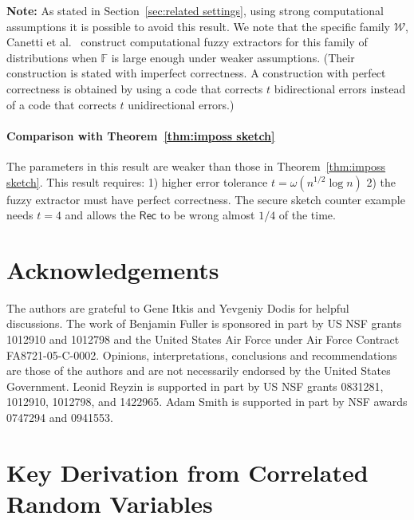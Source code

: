 \documentclass[11pt]{article}
\newcommand{\secref}[1]{\mbox{Section~\ref{#1}}}
\newcommand{\thref}[1]{\mbox{Theorem~\ref{#1}}}
\newcommand{\class}[1]{{\ensuremath{\mathsf{#1}}}}
\newcommand{\rec}{\ensuremath{\class{Rec}}\xspace}
\begin{document}
\noindent
\textbf{Note:} As stated in \secref{sec:related settings}, using strong computational assumptions it is possible to avoid this result.  We note that the specific family $\mathcal{W}$, Canetti et al.~\cite[Construction 5.3]{canetti2014key} construct computational fuzzy extractors  for this family of distributions when $\mathbb{F}$ is large enough under weaker assumptions.  (Their construction is stated with imperfect correctness.  A construction with perfect correctness is obtained by using a code that corrects $t$ bidirectional errors instead of a code that corrects $t$ unidirectional errors.)

\paragraph{Comparison with \thref{thm:imposs sketch}} The parameters in this result are weaker than those in \thref{thm:imposs sketch}.  This result requires: 1) higher error tolerance $t= \omega(n^{1/2}\log n)$ 2) the fuzzy extractor must have perfect correctness.  The secure sketch counter example needs $t=4$ and allows the $\rec$ to be wrong almost $1/4$ of the time.

\section*{Acknowledgements}
The authors are grateful to Gene Itkis and Yevgeniy Dodis for helpful discussions.
The work of Benjamin Fuller is sponsored in part by US NSF grants 1012910 and 1012798 and  the United States Air Force under Air Force Contract FA8721-05-C-0002. Opinions, interpretations, conclusions and recommendations are those of the authors and are not necessarily endorsed by the United States Government. 
Leonid Reyzin is supported in part by US NSF grants 0831281, 1012910, 1012798, and 1422965.  Adam Smith is supported in part by NSF awards 0747294 and 0941553.





\appendix

\section{Key Derivation from Correlated Random Variables}
\label{sec:corr variables}
\end{document}
